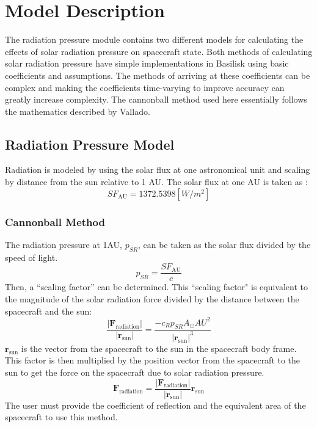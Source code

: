 \section{Model Description}
The radiation pressure module contains two different models for calculating the effects of solar radiation pressure on spacecraft state. Both methods of calculating solar radiation pressure have simple implementations in Basilisk using basic coefficients and assumptions. The methods of arriving at these coefficients can be complex and making the coefficients time-varying to improve accuracy can greatly increase complexity. The cannonball method used here essentially follows the mathematics described by Vallado\cite{vallado2001}.

\subsection{Radiation Pressure Model}
Radiation is modeled by using the solar flux at one astronomical unit and scaling by distance from the sun relative to 1 AU. The solar flux at one AU is taken as :
\begin{equation}
SF_{\mathrm{AU}} = 1372.5398    [W/m^2]
\end{equation}
\subsubsection{Cannonball Method}
The radiation pressure at 1AU, $p_{SR}$, can be taken as the solar flux divided by the speed of light. 
\begin{equation}
	p_{SR} = \frac{SF_{\mathrm{AU}}}{c}
\end{equation}
Then, a ``scaling factor'' can be determined. This ``scaling factor" is equivalent to the magnitude of the solar radiation force divided by the distance between the spacecraft and the sun:
\begin{equation}
	\frac{|\mathbf{F}_{\textrm{radiation}}|}{|\mathbf{r}_{\textrm{sun}}|} = \frac{-c_{R}p_{SR}A_{\odot}{AU}^2}{|\mathbf{r}_{\textrm{sun}}|^3}
\end{equation}
$\mathbf{r}_{\textrm{sun}}$ is the vector from the spacecraft to the sun in the spacecraft body frame. This factor is then multiplied by the position vector from the spacecraft to the sun to get the force on the spacecraft due to solar radiation pressure.
\begin{equation}
	{\mathbf{F}_{\textrm{radiation}}} = \frac{|\mathbf{F}_{\textrm{radiation}}|}{|\mathbf{r}_{\textrm{sun}}|}  \mathbf{r}_{\textrm{sun}}
\end{equation}
The user must provide the coefficient of reflection and the equivalent area of the spacecraft to use this method.\\
